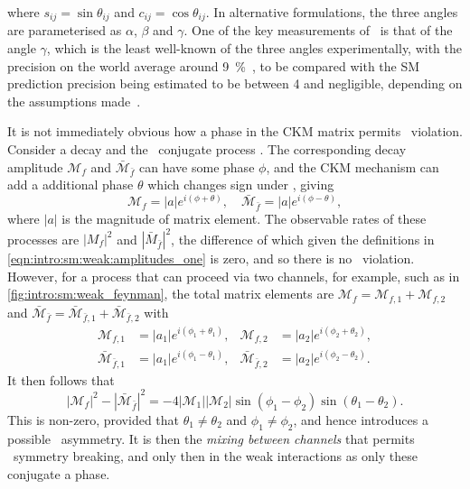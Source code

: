 where $s_{ij} = \sin{\theta_{ij}}$ and $c_{ij} = \cos{\theta_{ij}}$.
In alternative formulations, the three angles are parameterised as $\alpha$, $\beta$ and $\gamma$.
One of the key measurements of \lhcb\ is that of the angle $\gamma$, which is the least well-known of the three angles experimentally, with the precision on the world average around \SI{9}{\percent}~\cite{LHCb-CONF-2016-001}, to be compared with the \ac{SM} prediction precision being estimated to be between \SI{4}{\deg} and negligible, depending on the assumptions made~\cite{Brod:2013sga,Brod:2014bfa}.

It is not immediately obvious how a phase in the \ac{CKM} matrix permits \CP\ violation.
Consider a decay  and the \CP\ conjugate process
.
The corresponding decay amplitude $\mathcal{M}_{f}$ and $\bar{\mathcal{M}}_{\bar{f}}$ can have some phase $\phi$, and the \ac{CKM} mechanism can add a additional phase $\theta$ which changes sign under \CP, giving
\begin{equation}
  \mathcal{M}_{f}             = |a| e^{i(\phi + \theta)}, \quad
  \bar{\mathcal{M}}_{\bar{f}} = |a| e^{i(\phi - \theta)},
  \label{eqn:intro:sm:weak:amplitudes_one}
\end{equation}
where $|a|$ is the magnitude of matrix element.
The observable rates of these processes are $|M_{f}|^{2}$ and $|\bar{M}_{\bar{f}}|^{2}$, the difference of which given the definitions in \cref{eqn:intro:sm:weak:amplitudes_one} is zero, and so there is no \CP\ violation.
However, for a process that can proceed via two channels, for example, such as in 
\cref{fig:intro:sm:weak_feynman}, the total matrix elements are $\mathcal{M}_{f} = 
\mathcal{M}_{f,1} + \mathcal{M}_{f,2}$ and $\bar{\mathcal{M}}_{\bar{f}} = 
\bar{\mathcal{M}}_{\bar{f},1} + \bar{\mathcal{M}}_{\bar{f},2}$ with
\begin{align*}
  \mathcal{M}_{f,1} &= |a_{1}| e^{i(\phi_{1} + \theta_{1})}, &
  \mathcal{M}_{f,2} &= |a_{2}| e^{i(\phi_{2} + \theta_{2})},\\
  \bar{\mathcal{M}}_{\bar{f},1} &= |a_{1}| e^{i(\phi_{1} - \theta_{1})}, &
  \bar{\mathcal{M}}_{\bar{f},2} &= |a_{2}| e^{i(\phi_{2} - \theta_{2})}.
\end{align*}
It then follows that
\begin{equation*}
  |\mathcal{M}_{f}|^{2} - |\bar{\mathcal{M}}_{\bar{f}}|^{2} =
  -4|\mathcal{M}_{1}||\mathcal{M}_{2}|\sin(\phi_{1} - \phi_{2})\sin(\theta_{1} - \theta_{2}).
\end{equation*}
This is non-zero, provided that $\theta_{1} \neq \theta_{2}$ and $\phi_{1} \neq 
\phi_{2}$, and hence introduces a possible \CP\ asymmetry.
It is then the \emph{mixing between channels} that permits \CP\ symmetry 
breaking, and only then in the weak interactions as only these conjugate a 
phase.

